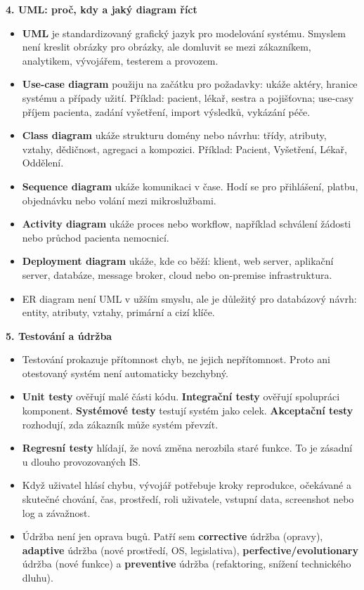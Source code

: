 \documentclass[11pt,a4paper]{article}
\begin{document}
\textbf{4. UML: proč, kdy a jaký diagram říct}
\begin{itemize}
  \item \textbf{UML} je standardizovaný grafický jazyk pro modelování systému. Smyslem není kreslit obrázky pro obrázky, ale domluvit se mezi zákazníkem, analytikem, vývojářem, testerem a provozem.
  \item \textbf{Use-case diagram} použiju na začátku pro požadavky: ukáže aktéry, hranice systému a případy užití. Příklad: pacient, lékař, sestra a pojišťovna; use-casy příjem pacienta, zadání vyšetření, import výsledků, vykázání péče.
  \item \textbf{Class diagram} ukáže strukturu domény nebo návrhu: třídy, atributy, vztahy, dědičnost, agregaci a kompozici. Příklad: Pacient, Vyšetření, Lékař, Oddělení.
  \item \textbf{Sequence diagram} ukáže komunikaci v čase. Hodí se pro přihlášení, platbu, objednávku nebo volání mezi mikroslužbami.
  \item \textbf{Activity diagram} ukáže proces nebo workflow, například schválení žádosti nebo průchod pacienta nemocnicí.
  \item \textbf{Deployment diagram} ukáže, kde co běží: klient, web server, aplikační server, databáze, message broker, cloud nebo on-premise infrastruktura.
  \item ER diagram není UML v užším smyslu, ale je důležitý pro databázový návrh: entity, atributy, vztahy, primární a cizí klíče.
\end{itemize}

\textbf{5. Testování a údržba}
\begin{itemize}
  \item Testování prokazuje přítomnost chyb, ne jejich nepřítomnost. Proto ani otestovaný systém není automaticky bezchybný.
  \item \textbf{Unit testy} ověřují malé části kódu. \textbf{Integrační testy} ověřují spolupráci komponent. \textbf{Systémové testy} testují systém jako celek. \textbf{Akceptační testy} rozhodují, zda zákazník může systém převzít.
  \item \textbf{Regresní testy} hlídají, že nová změna nerozbila staré funkce. To je zásadní u dlouho provozovaných IS.
  \item Když uživatel hlásí chybu, vývojář potřebuje kroky reprodukce, očekávané a skutečné chování, čas, prostředí, roli uživatele, vstupní data, screenshot nebo log a závažnost.
  \item Údržba není jen oprava bugů. Patří sem \textbf{corrective} údržba (opravy), \textbf{adaptive} údržba (nové prostředí, OS, legislativa), \textbf{perfective/evolutionary} údržba (nové funkce) a \textbf{preventive} údržba (refaktoring, snížení technického dluhu).
\end{itemize}
\end{document}
